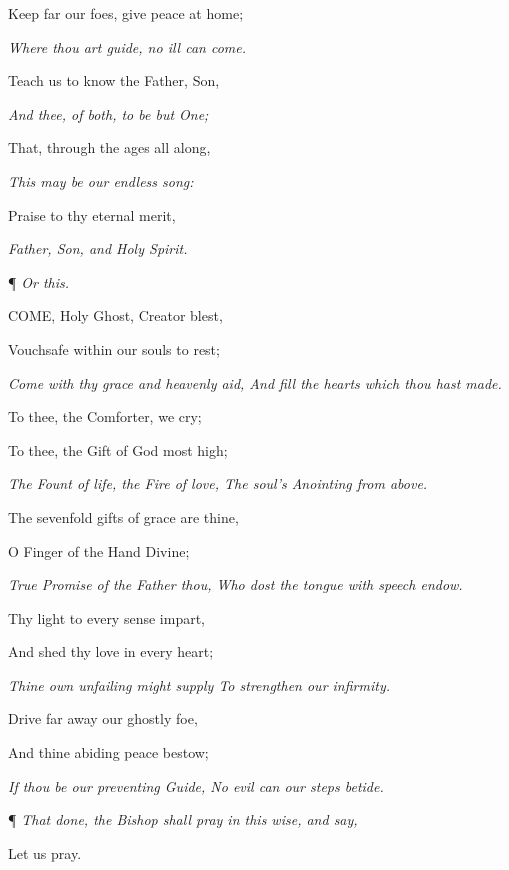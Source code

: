 Keep far our foes, give peace at home; 

\emph{Where thou art guide, no ill can come.}

Teach us to know the Father, Son, 

\emph{And thee, of both, to be but One;}

That, through the ages all along, 

\emph{This may be our endless song:}

Praise to thy eternal merit, 

\emph{Father, Son, and Holy Spirit.}

¶ \emph{Or this.}

COME, Holy Ghost, Creator
blest, 

Vouchsafe within our souls to rest; 

\emph{Come with thy grace and heavenly aid, And fill the hearts which thou hast made.}

To thee, the Comforter, we cry;

To thee, the Gift of God most high; 

\emph{The Fount of life, the Fire of love, The soul's Anointing from above.}

The sevenfold gifts of grace are thine, 

O Finger of the Hand Divine; 

\emph{True Promise of the Father thou, Who dost the tongue with speech endow.}

Thy light to every sense impart, 

And shed thy love in every heart; 

\emph{Thine own unfailing might supply To strengthen our infirmity.}

Drive far away our ghostly foe, 

And thine abiding peace bestow; 

\emph{If thou be our preventing Guide, No evil can our steps betide.}

¶ \emph{That done, the Bishop shall
pray in this wise, and say,}

Let us pray. 


